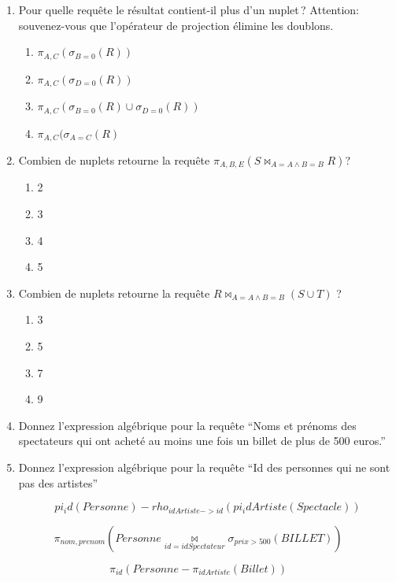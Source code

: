 \begin{enumerate}
  \item Pour quelle requête le résultat contient-il plus d’un nuplet\,?  Attention: souvenez-vous que l'opérateur
    de projection élimine les doublons.

    \begin{enumerate}
        \item  $\pi_{A,C} (\sigma_{B=0}(R))$
        \item $\pi_{A,C} (\sigma_{D=0}(R))$
       \item  $\pi_{A,C} (\sigma_{B=0}(R) \cup \sigma_{D=0}(R))$
    \item   $\pi_{A,C} (\sigma_{A=C}(R)$
    \end{enumerate}
    
    \item Combien de nuplets retourne la requête $\pi_{A,B,E} (S \Join_{A=A \land B=B} R) $?
    
           \begin{enumerate}
        \item  2
        \item 3
        \item 4
        \item 5
    \end{enumerate}
   \item  Combien de nuplets retourne la requête $R \Join_{A=A \land B=B} (S \cup T)$ ?
       \begin{enumerate}
        \item  3
        \item 5
        \item 7
        \item 9
    \end{enumerate}
   
  \item Donnez l'expression algébrique pour la requête ``Noms et prénoms des spectateurs qui ont 
      acheté au moins une fois un billet de plus de 500 euros.''
  \item Donnez l'expression algébrique pour la requête ``Id des personnes qui ne sont pas des artistes''
  
  $$pi_id (Personne) - rho_{idArtiste -> id} (pi_idArtiste (Spectacle))$$
\end{enumerate}



\begin{solution}
    $$\pi_{nom, prenom}(Personne \underset{id=idSpectateur}{\bowtie} \sigma_{prix > 500}(BILLET))$$

   $$\pi_{id}(Personne - \pi_{idArtiste} (Billet))$$
\
\end{solution}

